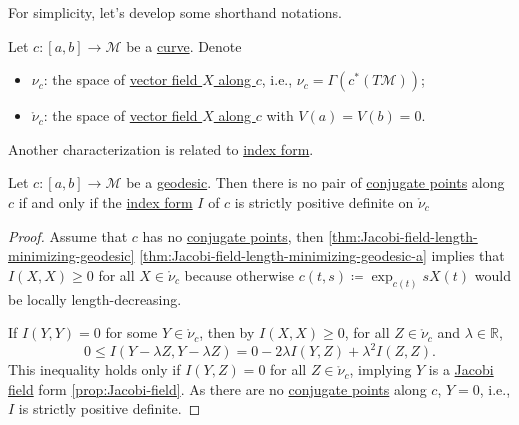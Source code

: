 For simplicity, let's develop some shorthand notations.

\begin{notation}
	Let \(c\colon [a, b] \to \mathcal{M} \) be a \hyperref[def:curve]{curve}. Denote
	\begin{itemize}
		\item \(\nu _c\): the space of \hyperref[def:vector-field-along-curve]{vector field \(X\) along \(c\)}, i.e., \(\nu _c = \Gamma (c^{\ast} (T \mathcal{M} ))\);
		\item \(\mathring{\nu }_c\): the space of \hyperref[def:vector-field-along-curve]{vector field \(X\) along \(c\)} with \(V(a) = V(b) = 0\).
	\end{itemize}
\end{notation}

Another characterization is related to \hyperref[def:index-form]{index form}.

\begin{lemma}\label{lma:conjugate-point-index-form}
	Let \(c\colon [a, b] \to \mathcal{M} \) be a \hyperref[def:geodesic]{geodesic}. Then there is no pair of \hyperref[def:conjugate-point]{conjugate points} along \(c\) if and only if the \hyperref[def:index-form]{index form} \(I\) of \(c\) is strictly positive definite on \(\mathring{\nu}_c\)
\end{lemma}
\begin{proof}\let\qed\relax
	Assume that \(c\) has no \hyperref[def:conjugate-point]{conjugate points}, then \autoref{thm:Jacobi-field-length-minimizing-geodesic} \autoref{thm:Jacobi-field-length-minimizing-geodesic-a} implies that
	\(I(X, X) \geq 0\) for all \(X \in \mathring{\nu }_c\) because otherwise \(c(t, s)\coloneqq \exp _{c(t)} s X(t)\) would be locally length-decreasing.

	If \(I(Y, Y) = 0\) for some \(Y\in \mathring{\nu }_c\), then by \(I(X, X ) \geq 0\), for all \(Z\in \mathring{\nu }_c\) and \(\lambda \in \mathbb{R} \),
	\[
		0 \leq I(Y - \lambda Z, Y - \lambda Z) = 0 - 2\lambda I(Y, Z) + \lambda ^2 I(Z, Z).
	\]
	This inequality holds only if \(I(Y, Z) = 0\) for all \(Z\in \mathring{\nu }_c\), implying \(Y\) is a \hyperref[def:Jacobi-field]{Jacobi field} form \autoref{prop:Jacobi-field}. As there are no \hyperref[def:conjugate-point]{conjugate points} along \(c\), \(Y = 0\), i.e., \(I\) is strictly positive definite.
\end{proof}